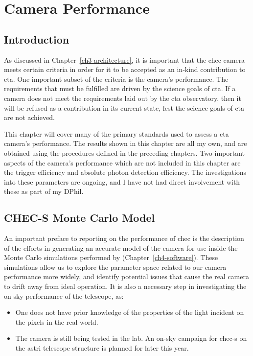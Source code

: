 \chapter{\label{ch7-performance}Camera Performance} 

\minitoc

\section{Introduction}

As discussed in Chapter~\ref{ch3-architecture}, it is important that the \gls{chec} camera meets certain criteria in order for it to be accepted as an in-kind contribution to \gls{cta}. One important subset of the criteria is the camera's performance. The requirements that must be fulfilled are driven by the science goals of \gls{cta}. If a camera does not meet the requirements laid out by the \gls{cta} observatory, then it will be refused as a contribution in its current state, lest the science goals of \gls{cta} are not achieved.

This chapter will cover many of the primary standards used to assess a \gls{cta} camera's performance. The results shown in this chapter are all my own, and are obtained using the procedures defined in the preceding chapters. Two important aspects of the camera's performance which are not included in this chapter are the trigger efficiency and absolute photon detection efficiency. The investigations into these parameters are ongoing, and I have not had direct involvement with these as part of my DPhil.

\section{CHEC-S Monte Carlo Model}

An important preface to reporting on the performance of \gls{chec} is the description of the efforts in generating an accurate model of the camera for use inside the Monte Carlo simulations performed by  (Chapter~\ref{ch4-software}). These simulations allow us to explore the parameter space related to our camera performance more widely, and identify potential issues that cause the real camera to drift away from ideal operation. It is also a necessary step in investigating the on-sky performance of the telescope, as:

\begin{itemize}
\item One does not have prior knowledge of the properties of the light incident on the pixels in the real world.
\item The camera is still being tested in the lab. An on-sky campaign for \gls{chec-s} on the \gls{astri} telescope structure is planned for later this year.
\end{itemize}

